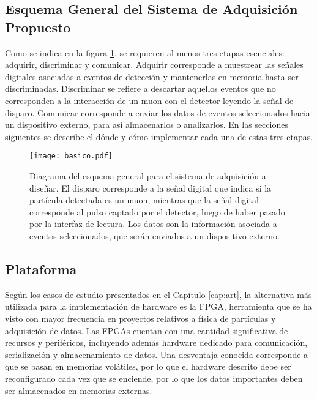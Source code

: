 	

	\subsection{Esquema General del Sistema de Adquisición Propuesto}
		Como se indica en la figura \ref{img:diagrama}, se requieren al menos tres etapas esenciales: adquirir, discriminar y comunicar. Adquirir corresponde a muestrear las señales digitales asociadas a eventos de detección y mantenerlas en memoria hasta ser discriminadas. Discriminar se refiere a descartar aquellos eventos que no corresponden a la interacción de un muon con el detector leyendo la señal de disparo. Comunicar corresponde a enviar los datos de eventos seleccionados hacia un dispositivo externo, para así almacenarlos o analizarlos. En las secciones siguientes se describe el dónde y cómo implementar cada una de estas tres etapas.
		
		\begin{figure}[h]
			\centering
			\texttt{[image: basico.pdf]}
			\caption{Diagrama del esquema general para el sistema de adquisición a diseñar. El disparo corresponde a la señal digital que indica si la partícula detectada es un muon, mientras que la señal digital corresponde al pulso captado por el detector, luego de haber pasado por la interfaz de lectura. Los datos son la información asociada a eventos seleccionados, que serán enviados a un dispositivo externo.}
			\label{img:diagrama}
		\end{figure}
	
	\subsection{Plataforma}
		Según los casos de estudio presentados en el Capítulo \ref{cap:art}, la alternativa más utilizada para la implementación de hardware  es la FPGA, herramienta que se ha visto con mayor frecuencia en proyectos relativos a física de partículas y adquisición de datos. Las FPGAs cuentan con una cantidad significativa de recursos y periféricos, incluyendo además hardware dedicado para comunicación, serialización y almacenamiento de datos. Una desventaja conocida corresponde a que se basan en memorias volátiles, por lo que el hardware descrito debe ser reconfigurado cada vez que se enciende, por lo que los datos importantes deben ser almacenados en memorias externas.
		
